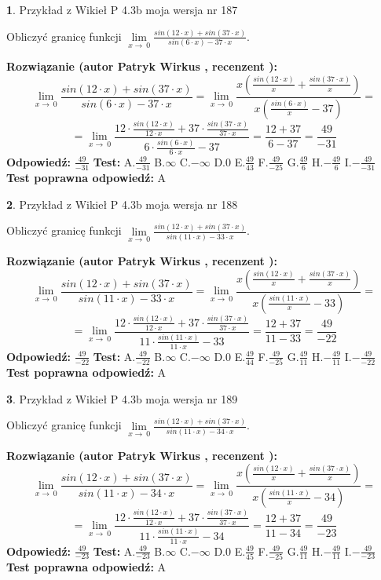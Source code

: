 \documentclass[12pt, a4paper]{article}
\theoremstyle{definition} %
\newtheorem{zad}{}
\newcommand{\zadStart}[1]{\begin{zad}#1\newline}
\newcommand{\zadStop}{\end{zad}}
\newcommand{\rozwStart}[2]{\noindent \textbf{Rozwiązanie (autor #1 , recenzent #2): }\newline}
\newcommand{\rozwStop}{\newline}
\newcommand{\odpStart}{\noindent \textbf{Odpowiedź:}\newline}
\newcommand{\odpStop}{\newline}
\newcommand{\testStart}{\noindent \textbf{Test:}\newline}
\newcommand{\testStop}{\newline}
\newcommand{\kluczStart}{\noindent \textbf{Test poprawna odpowiedź:}\newline}
\newcommand{\kluczStop}{\newline}
\begin{document}
\zadStart{Przykład z Wikieł P 4.3b moja wersja nr 187}


Obliczyć granicę funkcji $\lim\limits_{x\to\ 0}\frac{sin(12 \cdot x)+sin(37 \cdot x)}{sin(6 \cdot x)-37 \cdot x}$.
\zadStop
\rozwStart{Patryk Wirkus}{}
$$\lim\limits_{x\to\ 0}\frac{sin(12 \cdot x)+sin(37 \cdot x)}{sin(6 \cdot x)-37 \cdot x}=\lim\limits_{x\to\ 0}\frac{x(\frac{sin(12 \cdot x)}{x}+\frac{sin(37 \cdot x)}{x})}{x(\frac{sin(6 \cdot x)}{x}-37)}=$$
$$=\lim\limits_{x\to\ 0}\frac{12 \cdot \frac{sin(12 \cdot x)}{12 \cdot x}+37 \cdot \frac{sin(37 \cdot x)}{37 \cdot x}}{6 \cdot \frac{sin(6 \cdot x)}{6 \cdot x}-37}=\frac{12+37}{6-37} = \frac{49}{-31}$$
\rozwStop
\odpStart
$\frac{49}{-31}$
\odpStop
\testStart
A.$\frac{49}{-31}$
B.$\infty$
C.$-\infty$
D.$0$
E.$\frac{49}{43}$
F.$\frac{49}{-25}$
G.$\frac{49}{6}$
H.$-\frac{49}{6}$
I.$-\frac{49}{-31}$
\testStop
\kluczStart
A
\kluczStop



\zadStart{Przykład z Wikieł P 4.3b moja wersja nr 188}


Obliczyć granicę funkcji $\lim\limits_{x\to\ 0}\frac{sin(12 \cdot x)+sin(37 \cdot x)}{sin(11 \cdot x)-33 \cdot x}$.
\zadStop
\rozwStart{Patryk Wirkus}{}
$$\lim\limits_{x\to\ 0}\frac{sin(12 \cdot x)+sin(37 \cdot x)}{sin(11 \cdot x)-33 \cdot x}=\lim\limits_{x\to\ 0}\frac{x(\frac{sin(12 \cdot x)}{x}+\frac{sin(37 \cdot x)}{x})}{x(\frac{sin(11 \cdot x)}{x}-33)}=$$
$$=\lim\limits_{x\to\ 0}\frac{12 \cdot \frac{sin(12 \cdot x)}{12 \cdot x}+37 \cdot \frac{sin(37 \cdot x)}{37 \cdot x}}{11 \cdot \frac{sin(11 \cdot x)}{11 \cdot x}-33}=\frac{12+37}{11-33} = \frac{49}{-22}$$
\rozwStop
\odpStart
$\frac{49}{-22}$
\odpStop
\testStart
A.$\frac{49}{-22}$
B.$\infty$
C.$-\infty$
D.$0$
E.$\frac{49}{44}$
F.$\frac{49}{-25}$
G.$\frac{49}{11}$
H.$-\frac{49}{11}$
I.$-\frac{49}{-22}$
\testStop
\kluczStart
A
\kluczStop



\zadStart{Przykład z Wikieł P 4.3b moja wersja nr 189}


Obliczyć granicę funkcji $\lim\limits_{x\to\ 0}\frac{sin(12 \cdot x)+sin(37 \cdot x)}{sin(11 \cdot x)-34 \cdot x}$.
\zadStop
\rozwStart{Patryk Wirkus}{}
$$\lim\limits_{x\to\ 0}\frac{sin(12 \cdot x)+sin(37 \cdot x)}{sin(11 \cdot x)-34 \cdot x}=\lim\limits_{x\to\ 0}\frac{x(\frac{sin(12 \cdot x)}{x}+\frac{sin(37 \cdot x)}{x})}{x(\frac{sin(11 \cdot x)}{x}-34)}=$$
$$=\lim\limits_{x\to\ 0}\frac{12 \cdot \frac{sin(12 \cdot x)}{12 \cdot x}+37 \cdot \frac{sin(37 \cdot x)}{37 \cdot x}}{11 \cdot \frac{sin(11 \cdot x)}{11 \cdot x}-34}=\frac{12+37}{11-34} = \frac{49}{-23}$$
\rozwStop
\odpStart
$\frac{49}{-23}$
\odpStop
\testStart
A.$\frac{49}{-23}$
B.$\infty$
C.$-\infty$
D.$0$
E.$\frac{49}{45}$
F.$\frac{49}{-25}$
G.$\frac{49}{11}$
H.$-\frac{49}{11}$
I.$-\frac{49}{-23}$
\testStop
\kluczStart
A
\kluczStop
\end{document}
